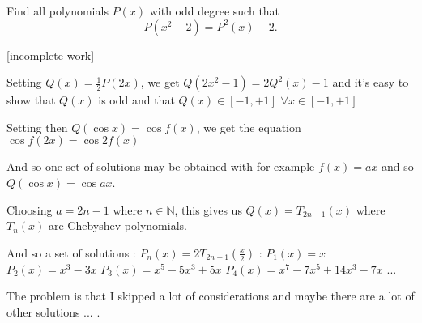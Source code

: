 \begin{solution}
	\begin{tcolorbox}Find all polynomials $P(x)$ with odd degree such that 
\[P(x^{2}-2)=P^{2}(x)-2.\]\end{tcolorbox}
[incomplete work]

Setting $Q(x)=\frac 12P(2x)$, we get $Q(2x^2-1)=2Q^2(x)-1$ and it's easy to show that $Q(x)$ is odd and that $Q(x)\in[-1,+1]$ $\forall x\in[-1,+1]$

Setting then $Q(\cos x)=\cos f(x)$, we get the equation $\cos f(2x)=\cos 2f(x)$

And so one set of solutions may be obtained with for example $f(x)=ax$ and so $Q(\cos x)=\cos ax$.

Choosing $a=2n-1$ where $n\in\mathbb N$, this gives us $Q(x)=T_{2n-1}(x)$ where $T_n(x)$ are Chebyshev polynomials.

And so a set of solutions : $\boxed{P_n(x)=2T_{2n-1}(\frac x2)}$ :
$P_1(x)=x$
$P_2(x)=x^3-3x$
$P_3(x)=x^5-5x^3+5x$
$P_4(x)=x^7-7x^5+14x^3-7x$
...


The problem is that I skipped a lot of considerations and maybe there are a lot of other solutions ... .
\end{solution}



